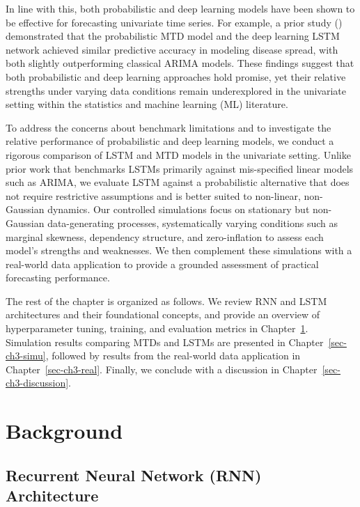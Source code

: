 \documentclass[
  letterpaper,
  double,
  12pt,
  1.0in]{beavtex}
\begin{document}
In line with this, both probabilistic and deep learning models have been
shown to be effective for forecasting univariate time series. For
example, a prior study ()
demonstrated that the probabilistic MTD model and the deep learning LSTM
network achieved similar predictive accuracy in modeling disease spread,
with both slightly outperforming classical ARIMA models. These findings
suggest that both probabilistic and deep learning approaches hold
promise, yet their relative strengths under varying data conditions
remain underexplored in the univariate setting within the statistics and
machine learning (ML) literature.

To address the concerns about benchmark limitations and to investigate
the relative performance of probabilistic and deep learning models, we
conduct a rigorous comparison of LSTM and MTD models in the univariate
setting. Unlike prior work that benchmarks LSTMs primarily against
mis-specified linear models such as ARIMA, we evaluate LSTM against a
probabilistic alternative that does not require restrictive assumptions
and is better suited to non-linear, non-Gaussian dynamics. Our
controlled simulations focus on stationary but non-Gaussian
data-generating processes, systematically varying conditions such as
marginal skewness, dependency structure, and zero-inflation to assess
each model's strengths and weaknesses. We then complement these
simulations with a real-world data application to provide a grounded
assessment of practical forecasting performance.

The rest of the chapter is organized as follows. We review RNN and LSTM
architectures and their foundational concepts, and provide an overview
of hyperparameter tuning, training, and evaluation metrics in
Chapter~\ref{sec-ch3-background}. Simulation results comparing MTDs and
LSTMs are presented in Chapter~\ref{sec-ch3-simu}, followed by results
from the real-world data application in Chapter~\ref{sec-ch3-real}.
Finally, we conclude with a discussion in
Chapter~\ref{sec-ch3-discussion}.

\chapter{Background}\label{sec-ch3-background}

\section{Recurrent Neural Network (RNN)
Architecture}\label{recurrent-neural-network-rnn-architecture}
\end{document}

